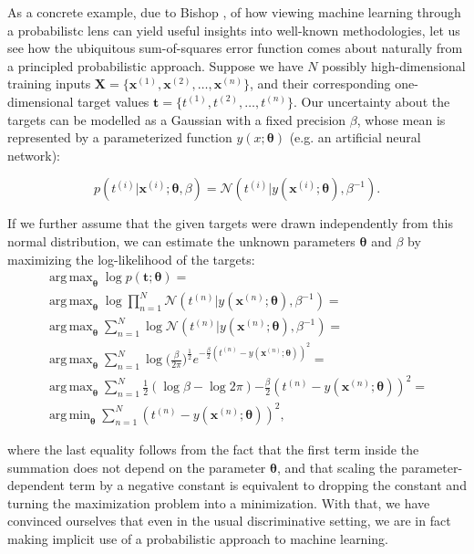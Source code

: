 \documentclass{report}
\DeclareMathOperator*{\argmax}{arg\,max}
\DeclareMathOperator*{\argmin}{arg\,min}
\begin{document}
\noindent As a concrete example, due to Bishop \cite{bishop-prml}, of how viewing machine learning through a probabilistc lens can yield useful insights into well-known methodologies, let us see how the ubiquitous sum-of-squares error function comes about naturally from a principled probabilistic approach. Suppose we have $N$ possibly high-dimensional training inputs $\mathbf{\boldsymbol{X}} = \{\boldsymbol{x}^{(1)}, \boldsymbol{x}^{(2)}, \dots, \boldsymbol{x}^{(n)}\}$, and their corresponding one-dimensional target values $\mathbf{t} = \{t^{(1)}, t^{(2)}, \dots, t^{(n)}\}$. Our uncertainty about the targets can be modelled as a Gaussian with a fixed precision $\beta$, whose mean is represented by a parameterized function $y(x; \boldsymbol{\theta})$ (e.g. an artificial neural network):

\[ p(t^{(i)}|\boldsymbol{x}^{(i)}; \boldsymbol{\theta}, \beta)  = \mathcal{N} (t^{(i)} | y(\boldsymbol{x}^{(i)}; \boldsymbol{\theta}), \beta^{-1}). \]

\bigskip

\noindent If we further assume that the given targets were drawn independently from this normal distribution, we can estimate the unknown parameters $\boldsymbol{\theta}$ and $\beta$ by maximizing the log-likelihood of the targets:
\begin{gather*}
\argmax_{\boldsymbol{\theta}} \log p(\mathbf{t}; \boldsymbol{\theta}) = \\
\argmax_{\boldsymbol{\theta}} \log \prod_{n=1}^N \mathcal{N}(t^{(n)} | y(\boldsymbol{x}^{(n)}; \boldsymbol{\theta}), \beta^{-1}) = \\
\argmax_{\boldsymbol{\theta}} \sum_{n=1}^N \log \mathcal{N}(t^{(n)} | y(\boldsymbol{x}^{(n)}; \boldsymbol{\theta}), \beta^{-1}) = \\
\argmax_{\boldsymbol{\theta}} \sum_{n=1}^N \log \Big(\frac{\beta}{2 \pi}\Big)^{\frac{1}{2}} e^{-\frac{\beta}{2} (t^{(n)} - y(\boldsymbol{x}^{(n)}; \boldsymbol{\theta}))^2} = \\
\argmax_{\boldsymbol{\theta}} \sum_{n=1}^N \frac{1}{2} (\log \beta - \log 2 \pi) {-\frac{\beta}{2} (t^{(n)} - y(\boldsymbol{x}^{(n)}; \boldsymbol{\theta}))^2} = \\
\argmin_{\boldsymbol{\theta}} \sum_{n=1}^N (t^{(n)} - y(\boldsymbol{x}^{(n)}; \boldsymbol{\theta}))^2,
\end{gather*} 

\noindent where the last equality follows from the fact that the first term inside the summation does not depend on the parameter $\boldsymbol{\theta}$, and that scaling the parameter-dependent term by a negative constant is equivalent to dropping the constant and turning the maximization problem into a minimization. With that, we have convinced ourselves that even in the usual discriminative setting, we are in fact making implicit use of a probabilistic approach to machine learning. \\
\end{document}
